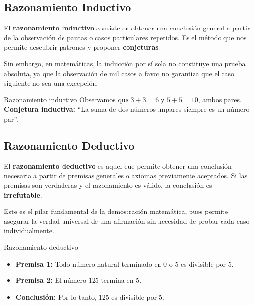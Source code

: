\subsection{Razonamiento Inductivo}

El \textbf{razonamiento inductivo} consiste en obtener una conclusión general a partir de la observación de pautas o casos particulares repetidos. Es el método que nos permite descubrir patrones y proponer \textbf{conjeturas}.

Sin embargo, en matemáticas, la inducción por sí sola no constituye una prueba absoluta, ya que la observación de mil casos a favor no garantiza que el caso siguiente no sea una excepción.

\begin{ejem}{Razonamiento inductivo}
    Observamos que $3+3=6$ y $5+5=10$, ambos pares. \\
    \textbf{Conjetura inductiva:} ``La suma de dos números impares siempre es un número par''.
\end{ejem}

\subsection{Razonamiento Deductivo}

El \textbf{razonamiento deductivo} es aquel que permite obtener una conclusión necesaria a partir de premisas generales o axiomas previamente aceptados. Si las premisas son verdaderas y el razonamiento es válido, la conclusión es \textbf{irrefutable}.

Este es el pilar fundamental de la demostración matemática, pues permite asegurar la verdad universal de una afirmación sin necesidad de probar cada caso individualmente.

\begin{ejem}{Razonamiento deductivo}
    \begin{itemize}
        \item \textbf{Premisa 1:} Todo número natural terminado en 0 o 5 es divisible por 5.
        \item \textbf{Premisa 2:} El número 125 termina en 5.
        \item \textbf{Conclusión:} Por lo tanto, 125 es divisible por 5.
    \end{itemize}
\end{ejem}

